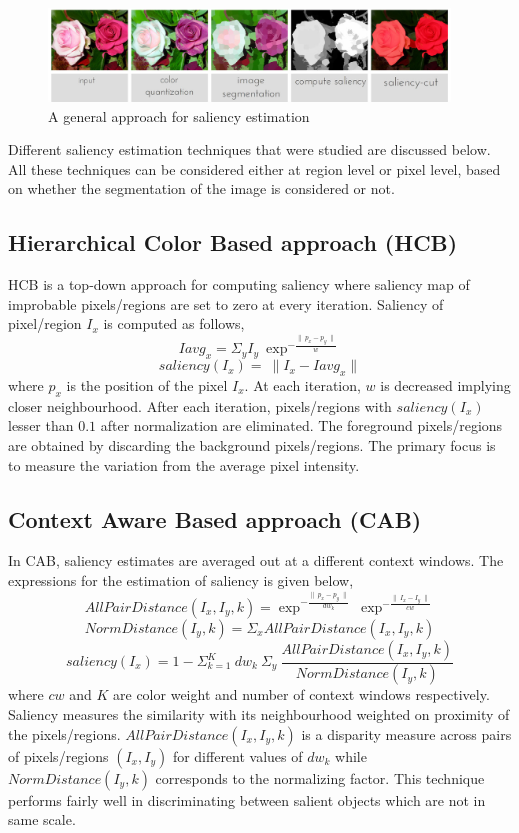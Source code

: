 \begin{figure}[htpb]
   \begin{center}
	    \includegraphics[width=0.95\textwidth]{snaps/sal/saliency.eps}     
     \caption {A general approach for saliency estimation}
   \label{fig:salap}
   \end{center}
 \end{figure}

\par Different saliency estimation techniques that were studied are discussed below.  All these techniques can be considered either at region level or pixel level, based on whether the segmentation of the image is considered or not.

\subsection{Hierarchical Color Based approach (HCB)} 
HCB is a top-down approach for computing saliency where saliency map of improbable pixels/regions are set to zero at every iteration.  Saliency of pixel/region $I_{x}$ is computed as follows,
$$ Iavg_{x} = \Sigma_{y} I_{y}~\exp^{-\frac{\parallel~p_{x} - p_{y}~\parallel}{w}}  $$
$$ saliency(I_{x}) =~\parallel I_{x} - Iavg_{x} \parallel $$
where $p_{x}$ is the position of the pixel $I_{x}$.  At each iteration, $w$ is decreased implying closer neighbourhood.  After each iteration, pixels/regions with $ saliency(I_{x})$ lesser than $0.1$ after normalization are eliminated.  The foreground pixels/regions are obtained by discarding the background pixels/regions.  The primary focus is to measure the variation from the average pixel intensity.

\subsection{Context Aware Based approach (CAB)}
In CAB, saliency estimates are averaged out at a different context windows.  The expressions for the estimation of saliency is given below,
$$ AllPairDistance(I_{x},I_{y},k) = \exp^{-\frac{\parallel~p_x - p_y~\parallel}{dw_k}}~\exp^{-\frac{\parallel~I_{x} - I_{y}~\parallel}{cw}}$$
$$ NormDistance(I_{y},k) = \Sigma_{x} AllPairDistance(I_{x},I_{y},k)$$
$$ saliency(I_{x}) = 1- \Sigma^{K}_{k=1}~dw_{k}~\Sigma_{y}~\frac{AllPairDistance(I_{x},I_{y},k)}{NormDistance(I_{y},k)}$$
where $cw$ and $K$ are color weight and number of context windows respectively.  Saliency measures the similarity with its neighbourhood weighted on proximity of the pixels/regions. $AllPairDistance(I_{x},I_{y},k)$ is a disparity measure across pairs of pixels/regions $(I_{x},I_{y})$ for different values of $dw_{k}$ while $NormDistance(I_{y},k)$ corresponds to the normalizing factor. This technique performs fairly well in discriminating between salient objects which are not in same scale.

